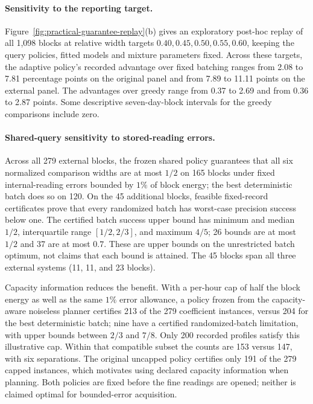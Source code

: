 \documentclass[12pt]{article}
\begin{document}
\paragraph{Sensitivity to the reporting target.}
Figure~\ref{fig:practical-guarantee-replay}(b) gives an exploratory post-hoc
replay of all 1,098 blocks at relative width targets
$0.40,0.45,0.50,0.55,0.60$, keeping the query policies, fitted models and
mixture parameters fixed.
Across these targets, the adaptive policy's recorded advantage over fixed
batching ranges from 2.08 to 7.81 percentage points on the original panel and
from 7.89 to 11.11 points on the external panel. The advantages over greedy
range from 0.37 to 2.69 and from 0.36 to 2.87 points. Some descriptive
seven-day-block intervals for the greedy comparisons include zero.

\FloatBarrier
\paragraph{Shared-query sensitivity to stored-reading errors.}
Across all 279 external blocks, the frozen shared policy guarantees that
all six normalized comparison widths are at most $1/2$ on 165 blocks under
fixed internal-reading errors bounded by $1\%$ of block energy; the best
deterministic batch does so on 120.  On the 45 additional blocks,
feasible fixed-record certificates prove that every randomized batch has
worst-case precision success below one.  The certified batch success
upper bound has minimum and median $1/2$, interquartile range
$[1/2,2/3]$, and maximum $4/5$; 26 bounds are at most $1/2$ and 37 are
at most $0.7$.  These are upper bounds on the unrestricted batch optimum,
not claims that each bound is attained.  The 45 blocks span all three
external systems (11, 11, and 23 blocks).

Capacity information reduces the benefit.  With a per-hour cap of half
the block energy as well as the same $1\%$ error allowance, a policy
frozen from the capacity-aware noiseless planner certifies 213 of the
279 coefficient instances, versus 204 for the best deterministic batch;
nine have a certified randomized-batch limitation, with upper bounds
between $2/3$ and $7/8$.  Only 200 recorded profiles satisfy this illustrative
cap.  Within that compatible subset the counts are 153 versus 147, with
six separations.  The original uncapped policy certifies only 191 of the
279 capped instances, which motivates using declared capacity information
when planning.  Both policies are fixed before the fine readings are
opened; neither is claimed optimal for bounded-error acquisition.
\end{document}

